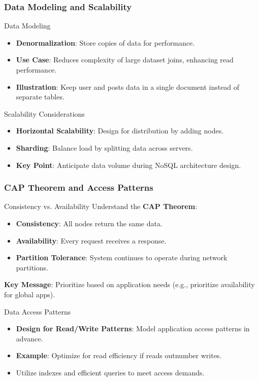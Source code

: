 \documentclass[aspectratio=169]{beamer}
\begin{document}
\begin{frame}[fragile]
    \frametitle{Data Modeling and Scalability}
    \begin{block}{Data Modeling}
        \begin{itemize}
            \item \textbf{Denormalization}: Store copies of data for performance.
            \item \textbf{Use Case}: Reduces complexity of large dataset joins, enhancing read performance.
            \item \textbf{Illustration}: Keep user and posts data in a single document instead of separate tables.
        \end{itemize}
    \end{block}
    
    \begin{block}{Scalability Considerations}
        \begin{itemize}
            \item \textbf{Horizontal Scalability}: Design for distribution by adding nodes.
            \item \textbf{Sharding}: Balance load by splitting data across servers.
            \item \textbf{Key Point}: Anticipate data volume during NoSQL architecture design.
        \end{itemize}
    \end{block}
\end{frame}

\begin{frame}[fragile]
    \frametitle{CAP Theorem and Access Patterns}
    \begin{block}{Consistency vs. Availability}
        Understand the \textbf{CAP Theorem}:
        \begin{itemize}
            \item \textbf{Consistency}: All nodes return the same data.
            \item \textbf{Availability}: Every request receives a response.
            \item \textbf{Partition Tolerance}: System continues to operate during network partitions.
        \end{itemize}
        \textbf{Key Message}: Prioritize based on application needs (e.g., prioritize availability for global apps).
    \end{block}

    \begin{block}{Data Access Patterns}
        \begin{itemize}
            \item \textbf{Design for Read/Write Patterns}: Model application access patterns in advance.
            \item \textbf{Example}: Optimize for read efficiency if reads outnumber writes.
            \item Utilize indexes and efficient queries to meet access demands.
        \end{itemize}
    \end{block}
\end{frame}
\end{document}
